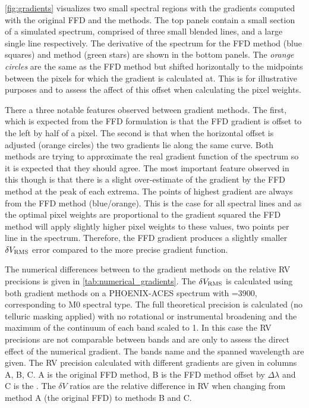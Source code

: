 

\cref{fig:gradients} visualizes two small spectral regions with the gradients computed with the original {FFD} and the \npgradient{} methods.
The top panels contain a small section of a simulated spectrum, comprised of three small blended lines, and a large single line respectively.
The derivative of the spectrum for the {FFD} method (blue squares) and \npgradient{} method (green stars) are shown in the bottom panels.
The \emph{orange circles} are the same as the {FFD} method but shifted horizontally to the midpoints between the pixels for which the gradient is calculated at.
This is for illustrative purposes and to assess the affect of this offset when calculating the pixel weights.

There a three notable features observed between gradient methods.
The first, which is expected from the {FFD} formulation is that the {FFD} gradient is offset to the left by half of a pixel.
The second is that when the horizontal offset is adjusted (orange circles) the two gradients lie along the same curve.
Both methods are trying to approximate the real gradient function of the spectrum so it is expected that they should agree.
The most important feature observed in this though is that there is a slight over-estimate of the gradient by the {FFD} method at the peak of each extrema.
The points of highest gradient are always from the {FFD} method (blue/orange).
This is the case for all spectral lines and as the optimal pixel weights are proportional to the gradient squared the {FFD} method will apply slightly higher pixel weights to these values, two points per line in the spectrum.
Therefore, the {FFD} gradient produces a slightly smaller \(\delta V_{\textrm{RMS}}\) error compared to the more precise gradient function.

The numerical differences between to the gradient methods on the relative RV precisions is given in \cref{tab:numerical_gradients}.
The \(\delta V_{\textrm{RMS}}\) is calculated using both gradient methods on a {PHOENIX-ACES} spectrum with \Teff{}=3900\K{}, corresponding to {{M0}} spectral type.
The full theoretical precision is calculated (no telluric masking applied) with no rotational or instrumental broadening and the maximum of the continuum of each band scaled to 1.
In this case the {RV} precisions are not comparable between bands and are only to assess the direct effect of the numerical gradient.
The bands name and the spanned wavelength are given.
The {RV} precision calculated with different gradients are given in columns A, B, C.
A is the original {FFD} method, B is the {FFD} method offset by \(\Delta\lambda\) and C is the \npgradient{}.
The \(\delta V\) ratios are the relative difference in {RV} when changing from method A (the original {FFD}) to methods B and C.

